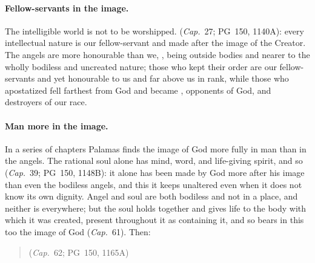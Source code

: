\paragraph{Fellow-servants in the image.} The intelligible world is not to
be worshipped.  (\emph{Cap.}\ 27; PG~150, 1140A): every intellectual
nature is our fellow-servant and made after the image of the Creator. The
angels are more honourable than we, , being
outside bodies and nearer to the wholly bodiless and uncreated nature; those
who kept their order are our fellow-servants and yet honourable to us and far
above us in rank, while those who apostatized fell farthest from God and
became , opponents of God, and destroyers of our race.

\paragraph{Man more in the image.} In a series of chapters Palamas finds
the image of God more fully in man than in the angels. The rational soul
alone has mind, word, and life-giving spirit, and so  (\emph{Cap.}\ 39; PG~150, 1148B): it alone has been made by
God more after his image than even the bodiless angels, and this it keeps
unaltered even when it does not know its own dignity. Angel and soul are
both bodiless and not in a place, and neither is everywhere; but the soul
holds together and gives life to the body with which it was created, present
throughout it as containing it, and so bears in this too the image of God
(\emph{Cap.}\ 61). Then:

\begin{quote}
 (\emph{Cap.}\ 62; PG~150, 1165A)
\end{quote}

